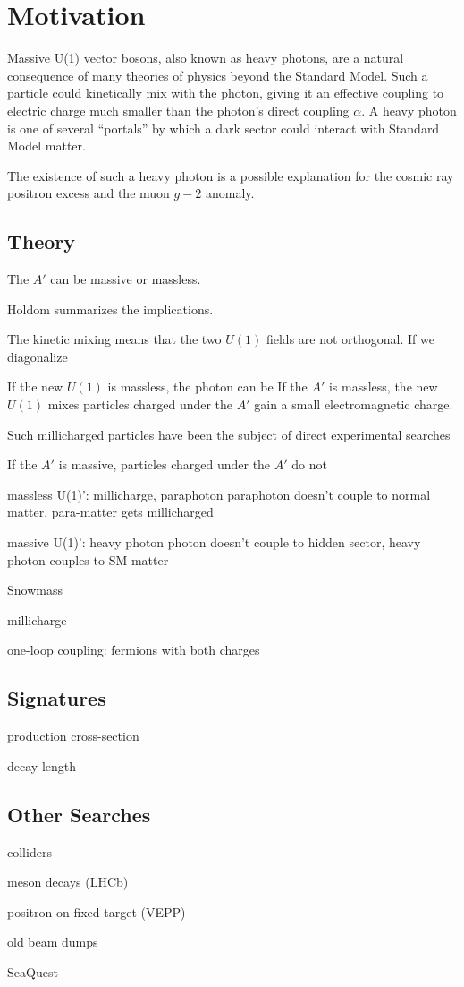 \chapter{Motivation}
Massive U(1) vector bosons, also known as heavy photons, are a natural consequence of many theories of physics beyond the Standard Model.
Such a particle could kinetically mix with the photon, giving it an effective coupling to electric charge much smaller than the photon's direct coupling $\alpha$.
A heavy photon is one of several ``portals'' by which a dark sector could interact with Standard Model matter.

The existence of such a heavy photon is a possible explanation for the cosmic ray positron excess and the muon $g-2$ anomaly.

\section{Theory}
The $A'$ can be massive or massless.


Holdom \cite{holdom_two_1986} summarizes the implications.

The kinetic mixing means that the two $U(1)$ fields are not orthogonal.
If we diagonalize

If the new $U(1)$ is massless, the photon can be
If the $A'$ is massless, the new $U(1)$ mixes 
particles charged under the $A'$ gain a small electromagnetic charge. 

Such millicharged particles have been the subject of direct experimental searches


If the $A'$ is massive, particles charged under the $A'$ do not 

massless U(1)': millicharge, paraphoton
paraphoton doesn't couple to normal matter, para-matter gets millicharged

massive U(1)': heavy photon
photon doesn't couple to hidden sector, heavy photon couples to SM matter


Snowmass \cite{essig_dark_2013}

millicharge \cite{davidson_updated_2000}

one-loop coupling: fermions with both charges



\section{Signatures}

production cross-section

decay length

\section{Other Searches}


colliders

meson decays (LHCb)

positron on fixed target (VEPP)

old beam dumps

SeaQuest
